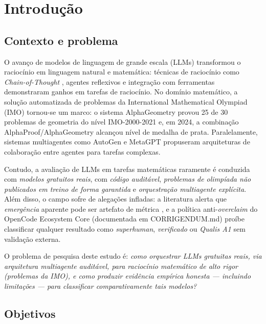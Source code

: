 \chapter{Introdução}

\section{Contexto e problema}

O avanço de modelos de linguagem de grande escala (LLMs) transformou o
raciocínio em linguagem natural e matemática: técnicas de raciocínio como
\textit{Chain-of-Thought} \cite{wei_cot}, agentes reflexivos
\cite{shinn_reflexion} e integração com ferramentas \cite{yao_react}
demonstraram ganhos em tarefas de raciocínio. No domínio matemático, a
solução automatizada de problemas da International Mathematical Olympiad
(IMO) tornou-se um marco: o sistema AlphaGeometry \cite{alpha_geometry}
provou 25 de 30 problemas de geometria do nível IMO-2000-2021 e, em 2024, a
combinação AlphaProof/AlphaGeometry alcançou nível de medalha de prata.
Paralelamente, sistemas multiagentes como AutoGen \cite{wu_autogen} e
MetaGPT \cite{hong_metagpt} propuseram arquiteturas de colaboração entre
agentes para tarefas complexas.

Contudo, a avaliação de LLMs em tarefas matemáticas \cite{hendrycks_math,
cobbe_gsm8k, hendrycks_mmlu} raramente é conduzida com \textit{modelos
gratuitos reais}, com \textit{código auditável}, \textit{problemas de olimpíada
não publicados em treino de forma garantida} e \textit{orquestração
multiagente explícita}. Além disso, o campo sofre de alegações infladas:
a literatura alerta que \textit{emergência} aparente pode ser artefato de
métrica \cite{schaeffer_mirage}, e a política anti-\textit{overclaim} do
OpenCode Ecosystem Core (documentada em CORRIGENDUM.md) proíbe classificar
qualquer resultado como \textit{superhuman}, \textit{verificado} ou
\textit{Qualis A1} sem validação externa.

O problema de pesquisa deste estudo é: \textit{como orquestrar LLMs gratuitas
reais, via arquitetura multiagente auditável, para raciocínio matemático de
alto rigor (problemas da IMO), e como produzir evidência empírica honesta —
incluindo limitações — para classificar comparativamente tais modelos?}

\section{Objetivos}


